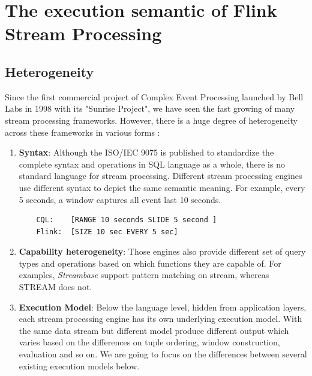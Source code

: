 
\chapter{The execution semantic of Flink Stream Processing}

\ifpdf
    \graphicspath{{Chapter3/Figs/Raster/}{Chapter3/Figs/PDF/}{Chapter3/Figs/}}
\else
    \graphicspath{{Chapter3/Figs/Vector/}{Chapter3/Figs/}}
\fi

\section{Heterogeneity}\label{Heterogeneity}
Since the first commercial project of Complex Event Processing launched by Bell Labs in 1998 with its "Sunrise Project", we have seen the fast growing of many stream processing frameworks. However, there is a huge degree of heterogeneity across these frameworks in various forms \citep{Dindar:2013}: 

\begin{enumerate}

	\item \textbf{Syntax}: Although the ISO/IEC 9075 is published to standardize the complete syntax and operations in SQL language as a whole, there is no standard language for stream processing. Different stream processing engines use different syntax to depict the same semantic meaning. For example, every 5 seconds, a window captures all event last 10 seconds. 
	\begin{verbatim}
	CQL: 	[RANGE 10 seconds SLIDE 5 second ] 
	Flink: 	[SIZE 10 sec EVERY 5 sec]
	\end{verbatim}
	
	\item \textbf{Capability heterogeneity}:
	Those engines also provide different set of query types and operations based on which functions they are capable of. For examples, \textit{Streambase} support pattern matching on stream, whereas STREAM does not.
	
	\item \textbf{Execution Model}: Below the language level, hidden from application layers, each stream processing engine has its own underlying execution model. With the same data stream but different model produce different output which varies based on the differences on tuple ordering,  window construction, evaluation and so on. We are going to focus on the differences between several existing execution models below.
	
	
\end{enumerate}
 
